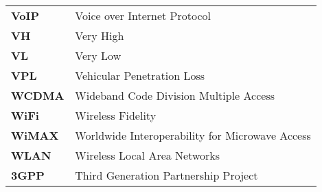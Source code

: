 \begin{table}[h]
\begin{adjustbox}{max width=\textwidth}
\begin{tabular}{ll}
\textbf{VoIP}& Voice over Internet Protocol\\	
\textbf{VH}&Very High \\ 
\textbf{VL}&Very Low \\ 		
\textbf{VPL}&Vehicular Penetration Loss\\			
\textbf{WCDMA}& Wideband Code Division Multiple Access\\		
\textbf{WiFi}& Wireless Fidelity\\				
\textbf{WiMAX}&Worldwide Interoperability for Microwave Access \\	
\textbf{WLAN}& Wireless Local Area Networks\\				
\textbf{3GPP}&Third Generation Partnership Project\\		
\end{tabular}
\end{adjustbox}
\end{table}			

